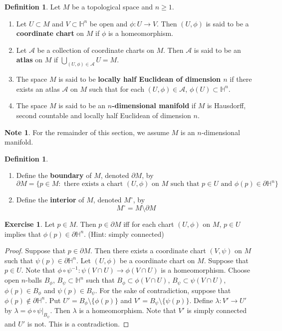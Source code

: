 \documentclass[12pt]{amsart}
\theoremstyle{definition}
\newtheorem{defn}[definition]{Definition}
\newtheorem{note}[definition]{Note}
\newtheorem{ex}[definition]{Exercise}
\newcommand{\lam}{\lambda}
\renewcommand{\H}{\mathbb{H}}
\newcommand{\MA}{\mathcal{A}}
\begin{document}
	\begin{defn}
		Let $M$ be a topological space and $n \geq 1$.
		\begin{enumerate}
			\item Let $U \subset M$ and $V \subset \H^n$ be open and $\phi:U \rightarrow V$. Then $(U, \phi)$ is said to be a \textbf{coordinate chart} on $M$ if $\phi$ is a homeomorphism. 
			\item Let $\MA$ be a collection of coordinate charts on $M$. Then $\MA$ is said to be an \textbf{atlas} on $M$ if  $\bigcup\limits_{(U,\phi) \in \MA} U = M$.
			\item The space $M$ is said to be \textbf{locally half Euclidean of dimension $n$} if there exists an atlas $\MA$ on $M$ such that for each $(U,\phi) \in \MA$, $\phi(U) \subset \H^n$.
			\item The space $M$ is said to be an \textbf{$n$-dimensional manifold} if $M$ is Hausdorff, second countable and locally half Euclidean of dimension $n$. 
		\end{enumerate}
	\end{defn}

	\begin{note}
		For the remainder of this section, we assume $M$ is an $n$-dimensional manifold.
	\end{note}

	\begin{defn}\
		\begin{enumerate}
			\item Define the 
			\textbf{boundary} of $M$, denoted $\partial M$, by $$\partial M = \{p \in M: \text{ there exists a chart } (U, \phi) \text{ on } M \text{ such that } p \in U \text{ and } \phi(p) \in \partial \H^n\}$$
			\item Define the 
			\textbf{interior} of $M$, denoted $M^{\circ}$, by $$M^{\circ} = M \setminus \partial M$$
		\end{enumerate}
	\end{defn}

	\begin{ex}
		Let $p \in M$. Then $p \in \partial M$ iff for each chart $(U, \phi)$ on $M$, $p \in U$ implies that $\phi(p) \in \partial \H^n$. (Hint: simply connected)
	\end{ex}

	\begin{proof}
		Suppose that $p \in \partial M$. Then there exists a coordinate chart $(V, \psi)$ on $M$ such that $\psi(p) \in \partial \H^n$. Let $(U, \phi)$ be a coordinate chart on $M$. Suppose that $p \in U$. Note that $\phi \circ \psi^{-1} : \psi(V \cap U) \rightarrow \phi(V \cap U)$ is a homeomorphism. Choose open $n$-balls $B_{\phi}$, $B_{\psi} \subset \H^n$ such that $B_{\phi} \subset \phi(V \cap U)$, $B_{\psi} \subset \psi(V \cap U)$, $\phi(p) \in B_{\phi}$ and $\psi(p) \in B_{\psi}$. For the sake of contradiction, suppose that $\phi(p) \not \in \partial \H^n$. Put $ U' = B_{\phi} \setminus \{\phi(p)\}$ and $V' = B_{\psi} \setminus \{\psi(p)\}$. Define $\lam: V' \rightarrow U'$ by $\lam = \phi \circ \psi|_{B_{\psi}}$. Then $\lam$ is a homeomorphism. Note that $V'$ is simply connected and $U'$ is not. This is a contradiction. 
	\end{proof}
\end{document}
